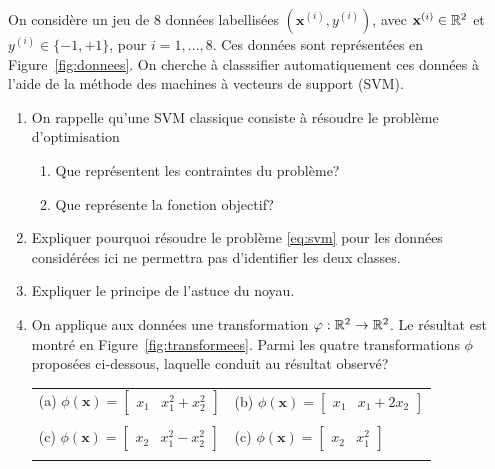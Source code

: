 On considère un jeu de $8$ données labellisées $(\mathbf{x}^{(i)},y^{(i)})$, avec $\mathbf{x}^{(i)} \in \mathbb{R}^2$ et $y^{(i)} \in \{-1,+1\}$, pour $i=1,\ldots,8$. Ces données sont représentées en Figure~\ref{fig:donnees}. On cherche à classsifier automatiquement ces données à l'aide de la méthode des machines à vecteurs de support (SVM).
\begin{enumerate}
	\item On rappelle qu'une SVM classique consiste à résoudre le problème d'optimisation
	\begin{enumerate}
		\item Que représentent les contraintes du problème?
		\item Que représente la fonction objectif?
	\end{enumerate}
	
	\item Expliquer pourquoi résoudre le problème \eqref{eq:svm} pour les données considérées ici ne permettra pas d'identifier les deux classes.

\item Expliquer le principe de l'astuce du noyau.

\item On applique aux données une transformation $\varphi:\mathbb{R}^2\to\mathbb{R}^2$. Le résultat est montré en Figure~\ref{fig:transformees}. Parmi les quatre transformations $\phi$ proposées ci-dessous, laquelle conduit au résultat observé?

\begin{tabular}{ll}
\\
	(a) $\displaystyle \phi(\mathbf{x}) = \begin{bmatrix} x_1 & x_1^2+x_2^2 \end{bmatrix}$
	&
	\qquad (b) $\displaystyle \phi(\mathbf{x}) = \begin{bmatrix} x_1 & x_1+2x_2 \end{bmatrix}$\\ \\
	(c) $\displaystyle \phi(\mathbf{x}) = \begin{bmatrix} x_2 & x_1^2-x_2^2 \end{bmatrix}$
	&
	\qquad (c) $\displaystyle \phi(\mathbf{x}) = \begin{bmatrix} x_2 & x_1^2 \end{bmatrix}$
	\\ \\
\end{tabular}


\end{enumerate}
